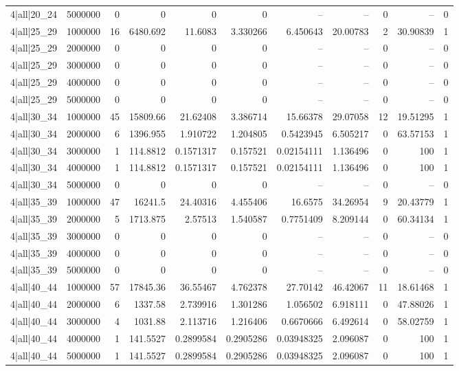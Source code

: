 \begin{tabular}{lrrrrrrrrrr}
4|all|20\_24 & 5000000 & 0 & 0 & 0 & 0 & -- & -- & 0 & -- & 0 \\
4|all|25\_29 & 1000000 & 16 & 6480.692 & 11.6083 & 3.330266 & 6.450643 & 20.00783 & 2 & 30.90839 & 1 \\
4|all|25\_29 & 2000000 & 0 & 0 & 0 & 0 & -- & -- & 0 & -- & 0 \\
4|all|25\_29 & 3000000 & 0 & 0 & 0 & 0 & -- & -- & 0 & -- & 0 \\
4|all|25\_29 & 4000000 & 0 & 0 & 0 & 0 & -- & -- & 0 & -- & 0 \\
4|all|25\_29 & 5000000 & 0 & 0 & 0 & 0 & -- & -- & 0 & -- & 0 \\
4|all|30\_34 & 1000000 & 45 & 15809.66 & 21.62408 & 3.386714 & 15.66378 & 29.07058 & 12 & 19.51295 & 1 \\
4|all|30\_34 & 2000000 & 6 & 1396.955 & 1.910722 & 1.204805 & 0.5423945 & 6.505217 & 0 & 63.57153 & 1 \\
4|all|30\_34 & 3000000 & 1 & 114.8812 & 0.1571317 & 0.157521 & 0.02154111 & 1.136496 & 0 & 100 & 1 \\
4|all|30\_34 & 4000000 & 1 & 114.8812 & 0.1571317 & 0.157521 & 0.02154111 & 1.136496 & 0 & 100 & 1 \\
4|all|30\_34 & 5000000 & 0 & 0 & 0 & 0 & -- & -- & 0 & -- & 0 \\
4|all|35\_39 & 1000000 & 47 & 16241.5 & 24.40316 & 4.455406 & 16.6575 & 34.26954 & 9 & 20.43779 & 1 \\
4|all|35\_39 & 2000000 & 5 & 1713.875 & 2.57513 & 1.540587 & 0.7751409 & 8.209144 & 0 & 60.34134 & 1 \\
4|all|35\_39 & 3000000 & 0 & 0 & 0 & 0 & -- & -- & 0 & -- & 0 \\
4|all|35\_39 & 4000000 & 0 & 0 & 0 & 0 & -- & -- & 0 & -- & 0 \\
4|all|35\_39 & 5000000 & 0 & 0 & 0 & 0 & -- & -- & 0 & -- & 0 \\
4|all|40\_44 & 1000000 & 57 & 17845.36 & 36.55467 & 4.762378 & 27.70142 & 46.42067 & 11 & 18.61468 & 1 \\
4|all|40\_44 & 2000000 & 6 & 1337.58 & 2.739916 & 1.301286 & 1.056502 & 6.918111 & 0 & 47.88026 & 1 \\
4|all|40\_44 & 3000000 & 4 & 1031.88 & 2.113716 & 1.216406 & 0.6670666 & 6.492614 & 0 & 58.02759 & 1 \\
4|all|40\_44 & 4000000 & 1 & 141.5527 & 0.2899584 & 0.2905286 & 0.03948325 & 2.096087 & 0 & 100 & 1 \\
4|all|40\_44 & 5000000 & 1 & 141.5527 & 0.2899584 & 0.2905286 & 0.03948325 & 2.096087 & 0 & 100 & 1 \\

\end{tabular}
